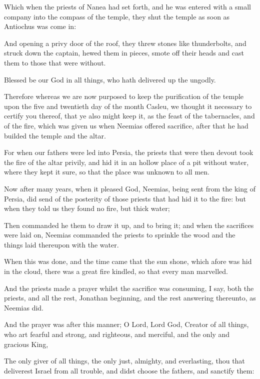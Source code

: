 {\par }{\PP {}Which when the priests of Nanea had set forth, and he was entered with a small company into the compass of the temple, they shut the temple as soon as Antiochus was come in:
\par }{\PP {}And opening a privy door of the roof, they threw stones like thunderbolts, and struck down the captain, hewed them in pieces, smote off their heads and cast them to those that were without.
\par }{\PP {}Blessed be our God in all things, who hath delivered up the ungodly.
\par }{\PP {}Therefore whereas we are now purposed to keep the purification of the temple upon the five and twentieth day of the month Casleu, we thought it necessary to certify you thereof, that ye also might keep it, as the feast of the tabernacles, and of the fire, which was given us when Neemias offered sacrifice, after that he had builded the temple and the altar.
\par }{\PP {}For when our fathers were led into Persia, the priests that were then devout took the fire of the altar privily, and hid it in an hollow place of a pit without water, where they kept it sure, so that the place was unknown to all men.
\par }{\PP {}Now after many years, when it pleased God, Neemias, being sent from the king of Persia, did send of the posterity of those priests that had hid it to the fire: but when they told us they found no fire, but thick water;
\par }{\PP {}Then commanded he them to draw it up, and to bring it; and when the sacrifices were laid on, Neemias commanded the priests to sprinkle the wood and the things laid thereupon with the water.
\par }{\PP {}When this was done, and the time came that the sun shone, which afore was hid in the cloud, there was a great fire kindled, so that every man marvelled.
\par }{\PP {}And the priests made a prayer whilst the sacrifice was consuming, I say, both the priests, and all the rest, Jonathan beginning, and the rest answering thereunto, as Neemias did.
\par }{\PP {}And the prayer was after this manner; O Lord, Lord God, Creator of all things, who art fearful and strong, and righteous, and merciful, and the only and gracious King,
\par }{\PP {}The only giver of all things, the only just, almighty, and everlasting, thou that deliverest Israel from all trouble, and didst choose the fathers, and sanctify them:
}
